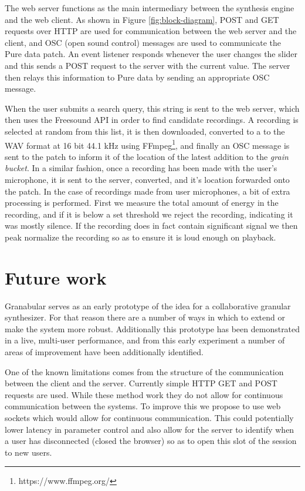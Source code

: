 \documentclass{nime-alternate}
\begin{document}
The web server functions as the main intermediary between the synthesis engine and the web client.
As shown in Figure \ref{fig:block-diagram}, POST and GET requests over HTTP are used for communication between the web server and the client,
and OSC (open sound control) messages are used to communicate the Pure data patch. 
An event listener responds whenever the user changes the slider and this sends a POST request to the server with the current value.
The server then relays this information to Pure data by sending an appropriate OSC message. 

When the user submits a search query, this string is sent to the web server, which then uses the Freesound API in order to find candidate recordings. 
A recording is selected at random from this list, it is then downloaded, converted to a to the WAV format at 16 bit 44.1 kHz using FFmpeg\footnote{https://www.ffmpeg.org/}, 
and finally an OSC message is sent to the patch to inform it of the location of the latest addition to the \emph{grain bucket}.
In a similar fashion, once a recording has been made with the user's microphone, it is sent to the server, converted, and it's location forwarded onto the patch.
In the case of recordings made from user microphones, a bit of extra processing is performed. 
First we measure the total amount of energy in the recording, and if it is below a set threshold we reject the recording, indicating it was mostly silence. 
If the recording does in fact contain significant signal we then peak normalize the recording so as to ensure it is loud enough on playback.

\section{Future work}

Granabular serves as an early prototype of the idea for a collaborative granular synthesizer.
For that reason there are a number of ways in which to extend or make the system more robust.
Additionally this prototype has been demonstrated in a live, multi-user performance, and
from this early experiment a number of areas of improvement have been additionally identified. 

One of the known limitations comes from the structure of the communication between the client 
and the server. Currently simple HTTP GET and POST requests are used. 
While these method work they do not allow for continuous communication between the systems.
To improve this we propose to use web sockets which would allow for continuous communication.
This could potentially lower latency in parameter control and also allow for the server to 
identify when a user has disconnected (closed the browser) so as to open this slot of the session to new users. 
\end{document}
